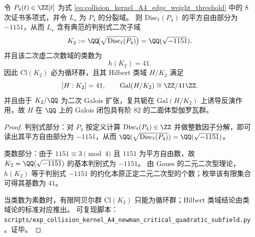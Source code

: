 



\begin{proposition}\label{prop:pom-a4t-newman-k2-class-number}
令 \(P_4(t)\in\ZZ[t]\) 为式 \eqref{eq:collision_kernel_A4_edge_weight_threshold} 中的 8 次证书多项式，并令 \(L_\star\) 为 \(P_4\) 的分裂域。
则 \(\mathrm{Disc}_t(P_4)\) 的平方自由部分为 \(-1151\)，从而 \(L_\star\) 含有典范的判别式二次子域
\[
K_2:=\QQ\!\bigl(\sqrt{\mathrm{Disc}_t(P_4)}\bigr)=\QQ(\sqrt{-1151}).
\]
并且该二次虚二次数域的类数为
\[
h(K_2)=41.
\]
因此 \(\mathrm{Cl}(K_2)\) 必为循环群，且其 Hilbert 类域 \(H/K_2\) 满足
\[
[H:K_2]=41,\qquad \mathrm{Gal}(H/K_2)\cong \ZZ/41\ZZ.
\]
并且由于 \(K_2/\QQ\) 为二次 Galois 扩张，复共轭在 \(\mathrm{Gal}(H/K_2)\) 上诱导反演作用，故 \(H\) 在 \(\QQ\) 上的 Galois 闭包具有阶 \(82\) 的二面体型伽罗瓦群。
\end{proposition}
\begin{proof}
判别式部分：对 \(P_4\) 按定义计算 \(\mathrm{Disc}_t(P_4)\in\ZZ\) 并做整数因子分解，即可读出其平方自由部分为 \(-1151\)，从而 \( \QQ(\sqrt{\mathrm{Disc}_t(P_4)})=\QQ(\sqrt{-1151}) \)。
\par
类数部分：由于 \(1151\equiv 3\pmod 4\) 且 \(1151\) 为平方自由数，故 \(K_2=\QQ(\sqrt{-1151})\) 的基本判别式为 \(-1151\)。
由 Gauss 的二元二次型理论，\(h(K_2)\) 等于判别式 \(-1151\) 的约化本原正定二元二次型的个数；枚举该有限集合可得其基数为 \(41\)。
\par
当类数为素数时，有限阿贝尔群 \(\mathrm{Cl}(K_2)\) 只能为循环群；Hilbert 类域结论由类域论的标准对应推出。
可复现脚本：\texttt{scripts/exp\_collision\_kernel\_A4\_newman\_critical\_quadratic\_subfield.py}。证毕。
\end{proof}



